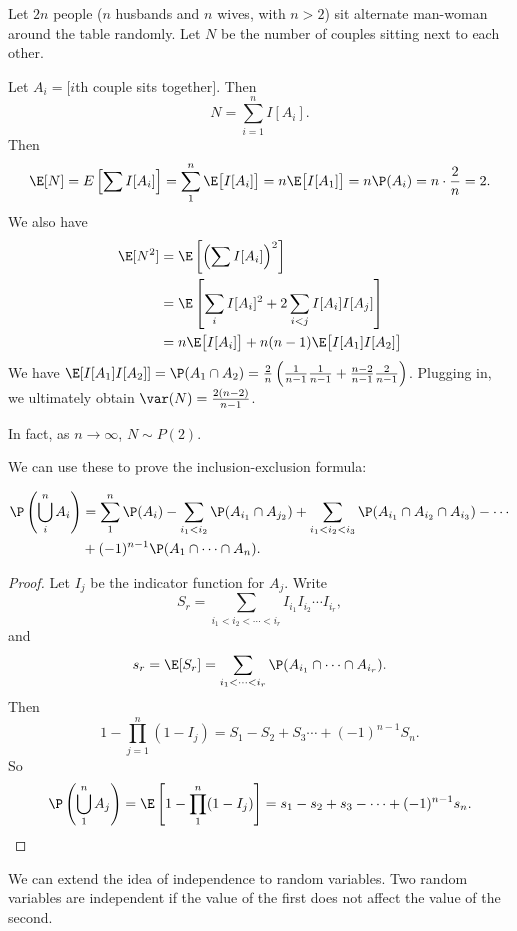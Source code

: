\documentclass[a4paper]{article}
\begin{document}
\begin{eg}
  Let $2n$ people ($n$ husbands and $n$ wives, with $n > 2$) sit alternate man-woman around the table randomly. Let $N$ be the number of couples sitting next to each other.

  Let $A_i = [i$th couple sits together$]$. Then
  \[
    N = \sum_{i = 1}^n I[A_i].
  \]
  Then
  \[
    \E[N] = E\left[\sum I[A_i]\right] = \sum_{1}^n \E\big[I[A_i]\big] = n\E\big[I[A_1]\big] = n\P(A_i) = n\cdot \frac{2}{n} = 2.
  \]
  We also have
  \begin{align*}
    \E[N^2] &= \E\left[\left(\sum I[A_i]\right)^2\right]\\
    &= \E\left[\sum_i I[A_i]^2 + 2\sum_{i < j}I[A_i]I[A_j]\right]\\
    &= n\E\big[I[A_i]\big] + n(n - 1)\E\big[I[A_1]I[A_2]\big]
  \end{align*}
  We have $\E[I[A_1]I[A_2]] = \P(A_1\cap A_2) = \frac{2}{n}\left(\frac{1}{n - 1}\frac{1}{n - 1}  + \frac{n - 2}{n - 1}\frac{2}{n - 1}\right)$. Plugging in, we ultimately obtain $\var(N) = \frac{2(n- 2)}{n - 1}$.

  In fact, as $n\to \infty$, $N\sim P(2)$.
\end{eg}

We can use these to prove the inclusion-exclusion formula:
\begin{thm}
  \begin{align*}
    \P\left(\bigcup_i^n A_i\right) &= \sum_1^n \P(A_i) - \sum_{i_1 < i_2} \P(A_{i_1}\cap A_{j_2}) + \sum_{i_1 < i_2 < i_3}\P(A_{i_1}\cap A_{i_2} \cap A_{i_3}) - \cdots\\
    &+ (-1)^{n - 1} \P(A_1\cap \cdots \cap A_n).
  \end{align*}
\end{thm}

\begin{proof}
  Let $I_j$ be the indicator function for $A_j$. Write
  \[
    S_r = \sum_{i_1 < i_2 < \cdots < i_r}I_{i_1}I_{i_2}\cdots I_{i_r},
  \]
  and
  \[
    s_r = \E[S_r] = \sum_{i_1 < \cdots < i_r}\P(A_{i_1}\cap \cdots \cap A_{i_r}).
  \]
  Then
  \[
    1 - \prod_{j = 1}^n(1 - I_j) = S_1 - S_2 + S_3 \cdots + (-1)^{n - 1}S_n.
  \]
  So
  \[
    \P\left(\bigcup_1^n A_j\right) = \E\left[1 - \prod_1^n(1 - I_j)\right] = s_1 - s_2 + s_3 - \cdots + (-1)^{n - 1}s_n.
  \]
\end{proof}

We can extend the idea of independence to random variables. Two random variables are independent if the value of the first does not affect the value of the second.
\end{document}
